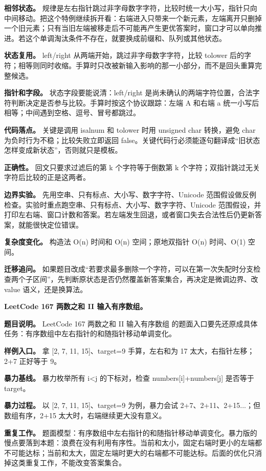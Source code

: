 \textbf{相邻状态。} 规律是左右指针跳过非字母数字字符，比较时统一大小写，指针只向中间移动。把这个特例继续拆开看：右端进入只带来一个新元素，左端离开只删掉一个旧元素；只有当旧左端被移走后不可能再产生更优答案时，窗口才可以单向推进。若这个单调淘汰条件不存在，就要换成前缀和、队列或其他状态。

\textbf{状态复用。} left/right 从两端开始，跳过非字母数字字符，比较 tolower 后的字符；相等则同时收缩。手算时只改被新输入影响的那一小部分，而不是回头重算完整候选。

\textbf{指针和字段。} 状态字段要能说清：left/right 是尚未确认的两端字符位置，合法字符判断决定是否参与比较。手算时按这个协议跟踪：左端 A 和右端 a 统一小写后相等；中间遇到空格、逗号、冒号都跳过。

\textbf{代码落点。} 关键是调用 isalnum 和 tolower 时用 unsigned char 转换，避免 char 为负时行为不稳；比较失败立即返回 false。关键代码行必须能逐句翻译成“旧状态怎样变成新状态”，否则就只是模板。

\textbf{正确性。} 回文只要求过滤后的第 k 个字符等于倒数第 k 个字符；双指针跳过无关字符后比较的正是这两者。

\textbf{边界实验。} 先用空串、只有标点、大小写、数字字符、Unicode 范围假设做反例检查。实验时重点跑空串、只有标点、大小写、数字字符、Unicode 范围假设，并打印左右端、窗口计数和答案。若左端发生回退，或者窗口失去合法性后仍更新答案，就能很快定位错误。

\textbf{复杂度变化。} 构造法 O(n) 时间和 O(n) 空间；原地双指针 O(n) 时间、O(1) 空间。

\textbf{迁移追问。} 如果题目改成“若要求最多删除一个字符，可以在第一次失配时分支检查两个子区间”，先判断原状态是否仍然覆盖新答案集合，再决定是微调边界、改 value 语义，还是换算法。

\noindent\textbf{LeetCode 167 两数之和 II 输入有序数组。}

\textbf{题目说明。} LeetCode 167 两数之和 II 输入有序数组 的题面入口要先还原成具体任务：有序数组中左右指针的和随指针移动单调变化。

\textbf{样例入口。} 拿 [2, 7, 11, 15]、target=9 手算，左右和为 17 太大，右指针左移；2+7 正好等于 9。

\textbf{暴力基线。} 暴力枚举所有 i<j 的下标对，检查 numbers[i]+numbers[j] 是否等于 target。

\textbf{暴力过程。} 以 [2, 7, 11, 15]、target=9 为例，暴力会试 2+7、2+11、2+15...；但数组有序，2+15 太大时，右端继续更大没有意义。

\textbf{重复工作。} 题面模型：有序数组中左右指针的和随指针移动单调变化。暴力版的慢点要落到本题：浪费在没有利用有序性。当前和太小，固定右端时更小的左端都不可能达标；当前和太大，固定左端时更大的右端都不可能达标。后面的优化只消掉这类重复工作，不能改变答案集合。

